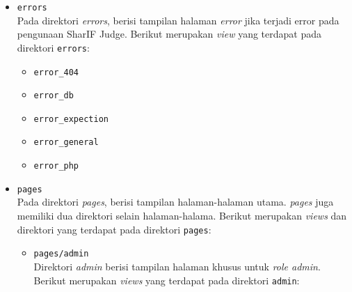 \documentclass[a4paper,twoside]{article}
\begin{document}
\begin{enumerate}
\begin{itemize}
		            \begin{itemize}
			            \item \verb|errors| \\
			                  Pada direktori \textit{errors}, berisi tampilan halaman \textit{error} jika terjadi error pada pengunaan SharIF Judge. Berikut merupakan \textit{view} yang terdapat pada direktori \verb|errors|:

			                  \begin{itemize}
				                  \item \verb|error_404|
				                  \item \verb|error_db|
				                  \item \verb|error_expection|
				                  \item \verb|error_general|
				                  \item \verb|error_php|
			                  \end{itemize}

			            \item \verb|pages| \\
			                  Pada direktori \textit{pages}, berisi tampilan halaman-halaman utama. \textit{pages} juga memiliki dua direktori selain halaman-halama. Berikut merupakan \textit{views} dan direktori yang terdapat pada direktori \verb|pages|:

			                  \begin{itemize}
				                  \item \verb|pages/admin| \\
				                        Direktori \textit{admin} berisi tampilan halaman khusus untuk \textit{role admin}. Berikut merupakan \textit{views} yang terdapat pada direktori \verb|admin|:


\end{itemize}
\end{itemize}
\end{itemize}
\end{enumerate}
\end{document}
